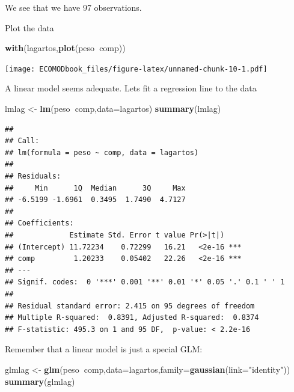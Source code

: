 \documentclass[
]{book}
\newenvironment{Shaded}{\begin{snugshade}}{\end{snugshade}}
\newcommand{\DataTypeTok}[1]{\textcolor[rgb]{0.13,0.29,0.53}{#1}}
\newcommand{\KeywordTok}[1]{\textcolor[rgb]{0.13,0.29,0.53}{\textbf{#1}}}
\newcommand{\NormalTok}[1]{#1}
\newcommand{\OperatorTok}[1]{\textcolor[rgb]{0.81,0.36,0.00}{\textbf{#1}}}
\newcommand{\StringTok}[1]{\textcolor[rgb]{0.31,0.60,0.02}{#1}}
\begin{document}
We see that we have 97 observations.

Plot the data

\begin{Shaded}
\begin{Highlighting}[]
\KeywordTok{with}\NormalTok{(lagartos,}\KeywordTok{plot}\NormalTok{(peso}\OperatorTok{~}\NormalTok{comp))}
\end{Highlighting}
\end{Shaded}

\texttt{[image: ECOMODbook\_files/figure-latex/unnamed-chunk-10-1.pdf]}

A linear model seems adequate. Lets fit a regression line to the data

\begin{Shaded}
\begin{Highlighting}[]
\NormalTok{lmlag <-}\StringTok{ }\KeywordTok{lm}\NormalTok{(peso}\OperatorTok{~}\NormalTok{comp,}\DataTypeTok{data=}\NormalTok{lagartos)}
\KeywordTok{summary}\NormalTok{(lmlag)}
\end{Highlighting}
\end{Shaded}

\begin{verbatim}
## 
## Call:
## lm(formula = peso ~ comp, data = lagartos)
## 
## Residuals:
##     Min      1Q  Median      3Q     Max 
## -6.5199 -1.6961  0.3495  1.7490  4.7127 
## 
## Coefficients:
##             Estimate Std. Error t value Pr(>|t|)    
## (Intercept) 11.72234    0.72299   16.21   <2e-16 ***
## comp         1.20233    0.05402   22.26   <2e-16 ***
## ---
## Signif. codes:  0 '***' 0.001 '**' 0.01 '*' 0.05 '.' 0.1 ' ' 1
## 
## Residual standard error: 2.415 on 95 degrees of freedom
## Multiple R-squared:  0.8391,	Adjusted R-squared:  0.8374 
## F-statistic: 495.3 on 1 and 95 DF,  p-value: < 2.2e-16
\end{verbatim}

Remember that a linear model is just a special GLM:

\begin{Shaded}
\begin{Highlighting}[]
\NormalTok{glmlag <-}\StringTok{ }\KeywordTok{glm}\NormalTok{(peso}\OperatorTok{~}\NormalTok{comp,}\DataTypeTok{data=}\NormalTok{lagartos,}\DataTypeTok{family=}\KeywordTok{gaussian}\NormalTok{(}\DataTypeTok{link=}\StringTok{"identity"}\NormalTok{))}
\KeywordTok{summary}\NormalTok{(glmlag)}
\end{Highlighting}
\end{Shaded}
\end{document}
